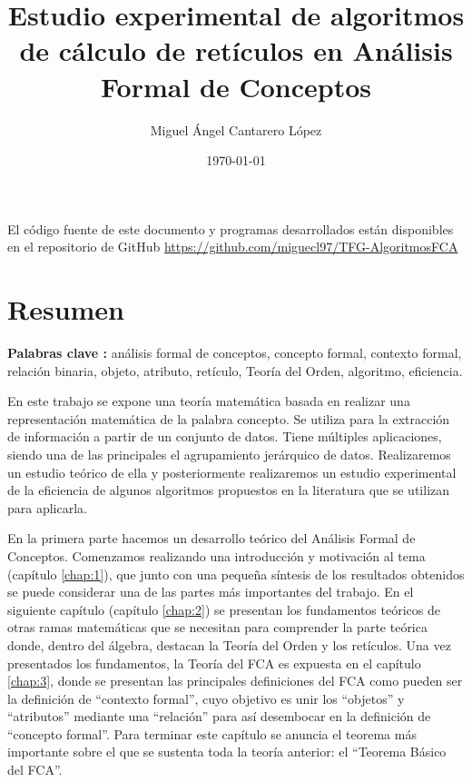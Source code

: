 \documentclass[oneside,openright,titlepage,numbers=noenddot,openany,headinclude,footinclude=true,
cleardoublepage=empty,abstractoff,BCOR=5mm,paper=a4,fontsize=12pt,main=spanish]{scrreprt}
\author{Miguel Ángel Cantarero López}
\date{\today}
\title{Estudio experimental de algoritmos de cálculo de retículos en Análisis Formal de Conceptos\\}
\begin{document}

\maketitle



\newpage
\vspace*{\fill}
\doclicenseThis
El código fuente de este documento y programas desarrollados están disponibles en el repositorio de GitHub \href{https://github.com/miguecl97/TFG-AlgoritmosFCA}{https://github.com/miguecl97/TFG-AlgoritmosFCA}

\chapter*{Resumen}


\textbf{Palabras clave :} análisis formal de conceptos, concepto formal, contexto formal, relación binaria, objeto, atributo, retículo, Teoría del Orden, algoritmo, eficiencia.

En este trabajo se expone una teoría matemática basada en realizar una representación matemática de la palabra concepto. Se utiliza para la extracción de información a partir de un conjunto de datos. Tiene múltiples aplicaciones, siendo una de las principales el agrupamiento jerárquico de datos. Realizaremos un estudio teórico de ella y posteriormente realizaremos un estudio experimental de la eficiencia de algunos algoritmos propuestos en la literatura que se utilizan para aplicarla.

En la primera parte hacemos un desarrollo teórico del Análisis Formal de Conceptos. Comenzamos realizando una introducción y motivación al tema (capítulo \ref{chap:1}), que junto con una pequeña síntesis de los resultados obtenidos se puede considerar una de las partes  más importantes del trabajo. En el siguiente capítulo (capítulo \ref{chap:2}) se presentan los fundamentos teóricos de otras ramas matemáticas que se necesitan para comprender la parte teórica donde, dentro del álgebra, destacan la Teoría del Orden y los retículos. Una vez presentados los fundamentos, la Teoría del FCA es expuesta en el capítulo \ref{chap:3}, donde se presentan las principales definiciones del FCA como pueden ser la definición de 
``contexto formal'', cuyo objetivo es unir los ``objetos'' y ``atributos'' mediante una ``relación'' para así desembocar en la definición de ``concepto formal''. Para terminar este capítulo se anuncia el teorema más importante sobre el que se sustenta toda la teoría anterior: el ``Teorema Básico del FCA''.
\end{document}
